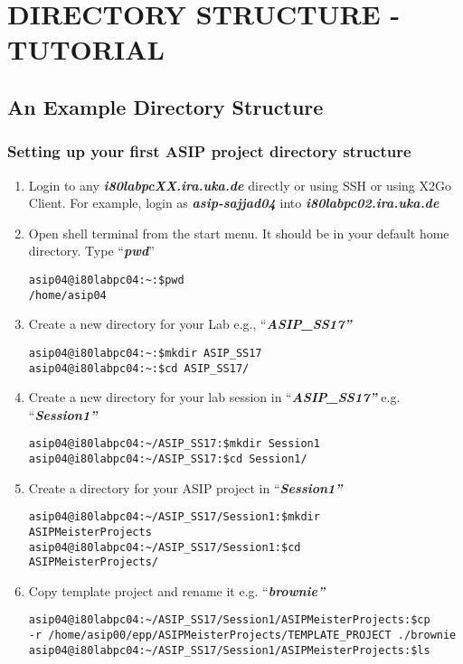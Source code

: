 \chapter*{DIRECTORY STRUCTURE -TUTORIAL}
\section*{An Example Directory Structure}
\subsection{Setting up your first ASIP project directory structure}
\begin{enumerate}
	\item Login to any \emph{\textbf{i80labpcXX.ira.uka.de}} directly or using SSH or using X2Go Client. For example, login as \emph{\textbf{asip-sajjad04}} into
	\emph{\textbf{i80labpc02.ira.uka.de}}
	\item Open shell terminal from the start menu. It should be in your default
	home directory. Type ``\emph{\textbf{pwd}}''
\begin{lstlisting}
asip04@i80labpc04:~:$pwd
/home/asip04
\end{lstlisting}
	\item Create a new directory for your Lab e.g., ``\emph{\textbf{ASIP\_SS17''}}
\begin{lstlisting}
asip04@i80labpc04:~:$mkdir ASIP_SS17
asip04@i80labpc04:~:$cd ASIP_SS17/
\end{lstlisting}
	\item Create a new directory for your lab session in ``\emph{\textbf{ASIP\_SS17''}} e.g. ``\emph{\textbf{Session1''}}
\begin{lstlisting}
asip04@i80labpc04:~/ASIP_SS17:$mkdir Session1
asip04@i80labpc04:~/ASIP_SS17:$cd Session1/
\end{lstlisting}
	\item Create a directory for your ASIP project in ``\emph{\textbf{Session1''}}
\begin{lstlisting}
asip04@i80labpc04:~/ASIP_SS17/Session1:$mkdir
ASIPMeisterProjects
asip04@i80labpc04:~/ASIP_SS17/Session1:$cd
ASIPMeisterProjects/
\end{lstlisting}
	\item Copy template project and rename it e.g. ``\emph{\textbf{brownie''}}
\begin{lstlisting}
asip04@i80labpc04:~/ASIP_SS17/Session1/ASIPMeisterProjects:$cp
-r /home/asip00/epp/ASIPMeisterProjects/TEMPLATE_PROJECT ./brownie
asip04@i80labpc04:~/ASIP_SS17/Session1/ASIPMeisterProjects:$ls

\end{lstlisting}
\end{enumerate}
